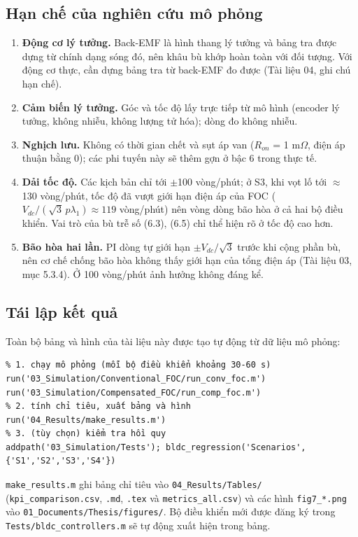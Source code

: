 \subsection{Hạn chế của nghiên cứu mô phỏng}\label{sec:7.5}

\begin{enumerate}[leftmargin=*]
\item \textbf{Động cơ lý tưởng.} Back-EMF là hình thang lý tưởng và bảng tra được dựng từ chính dạng sóng đó, nên khâu bù khớp hoàn toàn với đối tượng. Với động cơ thực, cần dựng bảng tra từ back-EMF đo được (Tài liệu 04, ghi chú hạn chế).
\item \textbf{Cảm biến lý tưởng.} Góc và tốc độ lấy trực tiếp từ mô hình (encoder lý tưởng, không nhiễu, không lượng tử hóa); dòng đo không nhiễu.
\item \textbf{Nghịch lưu.} Không có thời gian chết và sụt áp van ($R_{on}$ = 1 m$\Omega$, điện áp thuận bằng 0); các phi tuyến này sẽ thêm gợn ở bậc 6 trong thực tế.
\item \textbf{Dải tốc độ.} Các kịch bản chỉ tới $\pm$100 vòng/phút; ở S3, khi vọt lố tới $\approx$ 130 vòng/phút, tốc độ đã vượt giới hạn điện áp của FOC ($V_{dc}/(\sqrt3\,p\lambda_1) \approx 119$ vòng/phút) nên vòng dòng bão hòa ở cả hai bộ điều khiển. Vai trò của bù trễ số (6.3), (6.5) chỉ thể hiện rõ ở tốc độ cao hơn.
\item \textbf{Bão hòa hai lần.} PI dòng tự giới hạn $\pm$$V_{dc}/\sqrt3$ trước khi cộng phần bù, nên cơ chế chống bão hòa không thấy giới hạn của tổng điện áp (Tài liệu 03, mục 5.3.4). Ở 100 vòng/phút ảnh hưởng không đáng kể.
\end{enumerate}

\subsection{Tái lập kết quả}\label{sec:7.6}

Toàn bộ bảng và hình của tài liệu này được tạo tự động từ dữ liệu mô phỏng:

\begin{Verbatim}
% 1. chạy mô phỏng (mỗi bộ điều khiển khoảng 30-60 s)
run('03_Simulation/Conventional_FOC/run_conv_foc.m')
run('03_Simulation/Compensated_FOC/run_comp_foc.m')
% 2. tính chỉ tiêu, xuất bảng và hình
run('04_Results/make_results.m')
% 3. (tùy chọn) kiểm tra hồi quy
addpath('03_Simulation/Tests'); bldc_regression('Scenarios', {'S1','S2','S3','S4'})
\end{Verbatim}

\texttt{make\_results.m} ghi bảng chỉ tiêu vào \texttt{04\_Results/Tables/} (\texttt{kpi\_comparison.csv}, \texttt{.md}, \texttt{.tex} và \texttt{metrics\_all.csv}) và các hình \texttt{fig7\_*.png} vào \texttt{01\_Documents/Thesis/figures/}. Bộ điều khiển mới được đăng ký trong \texttt{Tests/bldc\_controllers.m} sẽ tự động xuất hiện trong bảng.
